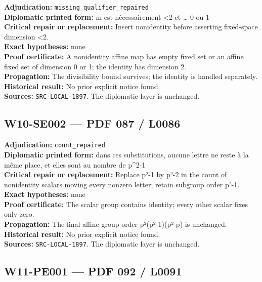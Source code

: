\documentclass[
  10pt,
  a4paper,
]{scrreprt}
\begin{document}
\textbf{Adjudication:} \texttt{missing\_qualifier\_repaired}\\
\textbf{Diplomatic printed form:} m est nécessairement \textless2 et
\ldots{} 0 ou 1\\
\textbf{Critical repair or replacement:} Insert nonidentity before
asserting fixed-space dimension \textless2.\\
\textbf{Exact hypotheses:} none\\
\textbf{Proof certificate:} A nonidentity affine map has empty fixed set
or an affine fixed set of dimension 0 or 1; the identity has dimension
2.\\
\textbf{Propagation:} The divisibility bound survives; the identity is
handled separately.\\
\textbf{Historical result:} No prior explicit notice found.\\
\textbf{Sources:} \texttt{SRC-LOCAL-1897}. The diplomatic layer is
unchanged.

\subsection{W10-SE002 --- PDF 087 /
L0086}\label{w10-se002-pdf-087-l0086}

\textbf{Adjudication:} \texttt{count\_repaired}\\
\textbf{Diplomatic printed form:} dans ces substitutions, aucune lettre
ne reste à la même place, et elles sont au nombre de p\^{}2-1\\
\textbf{Critical repair or replacement:} Replace p²-1 by p²-2 in the
count of nonidentity scalars moving every nonzero letter; retain
subgroup order p²-1.\\
\textbf{Exact hypotheses:} none\\
\textbf{Proof certificate:} The scalar group contains identity; every
other scalar fixes only zero.\\
\textbf{Propagation:} The final affine-group order p²(p²-1)(p²-p) is
unchanged.\\
\textbf{Historical result:} No prior explicit notice found.\\
\textbf{Sources:} \texttt{SRC-LOCAL-1897}. The diplomatic layer is
unchanged.

\subsection{W11-PE001 --- PDF 092 /
L0091}\label{w11-pe001-pdf-092-l0091}
\end{document}
